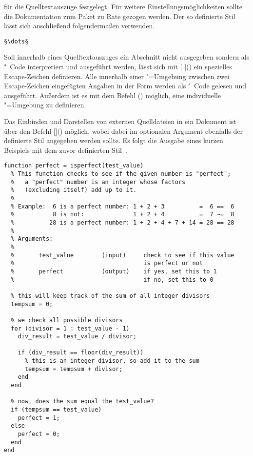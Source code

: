 \documentclass[%
  english,ngerman,%
  cdgeometry=no,DIV=12,automark,%
]{tudscrartcl}
\begin{document}
für die Quelltextauszüge festgelegt. Für weitere Einstellungsmöglichkeiten 
sollte die Dokumentation zum Paket zu Rate gezogen werden. Der so definierte 
Stil lässt sich anschließend folgendermaßen verwenden.
%
\begin{Hint}
\begin{lstlisting}[style=matlab]
§\dots§
\end{lstlisting}
\end{Hint}
%
Soll innerhalb eines Quelltextauszuges ein Abschnitt nicht ausgegeben sondern 
als "~Code interpretiert und ausgeführt werden, lässt sich mit 
[%
]() ein spezielles Escape-Zeichen definieren. Alle innerhalb 
einer "=Umgebung zwischen zwei Escape-Zeichen eingefügten 
Angaben in der Form \PValue{\dots} werden als 
"~Code gelesen und ausgeführt. Außerdem ist es mit dem Befehl 
() möglich, eine individuelle 
"=Umgebung zu definieren.

Das Einbinden und Darstellen von externen Quelldateien in ein Dokument ist über 
den Befehl
[\LParameter{}]() 
möglich, wobei dabei im optionalen Argument ebenfalls der definierte Stil 
angegeben werden sollte. Es folgt die Ausgabe eines kurzen Beispiels mit dem 
zuvor definierten Stil~.
%
\begin{lstlisting}[style=matlab]
function perfect = isperfect(test_value)
  % This function checks to see if the given number is "perfect";
  %   a "perfect" number is an integer whose factors 
  %   (excluding itself) add up to it.
  %
  % Example:  6 is a perfect number: 1 + 2 + 3          =  6 ==  6
  %           8 is not:              1 + 2 + 4          =  7 ~=  8
  %          28 is a perfect number: 1 + 2 + 4 + 7 + 14 = 28 == 28
  %
  % Arguments:
  %
  %       test_value        (input)     check to see if this value 
  %                                     is perfect or not
  %       perfect           (output)    if yes, set this to 1
  %                                     if no, set this to 0
  
  % this will keep track of the sum of all integer divisors
  tempsum = 0;
  
  % we check all possible divisors
  for (divisor = 1 : test_value - 1)
    div_result = test_value / divisor;
    
    if (div_result == floor(div_result)) 
      % this is an integer divisor, so add it to the sum
      tempsum = tempsum + divisor;
    end
  end
  
  % now, does the sum equal the test_value?
  if (tempsum == test_value) 
    perfect = 1;
  else
    perfect = 0;
  end
end
\end{lstlisting}
\end{document}

